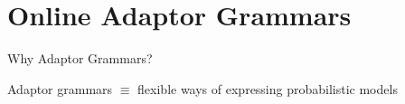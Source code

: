 
\newcommand{\AgHeader}[1]{\multicolumn{3}{c}{\begin{small}
      #1 \end{small} } \\ \hline}
\newcommand{\AgNonTerm}[2] {\textsc{#1}$_{#2}$}
\newcommand{\AgAdNonTerm}[2] {\underline{\textsc{#1}}$_{#2}$}
\newcommand{\AgRule}[2] { #1 $\mapsto$ #2 }
\newcommand{\AgEmpty}[1] { & & #1 }
\newcommand{\AgRange}[2] {$#1 = 1, \dots, #2$}

\section[InfAG]{Online Adaptor Grammars}
\label{section:infag}

\begin{frame}{Why Adaptor Grammars?}
  \begin{center}
      Adaptor grammars $\equiv$ flexible ways of expressing
      probabilistic models
    \vspace{2mm}

    \pause


\end{center}
\end{frame}
